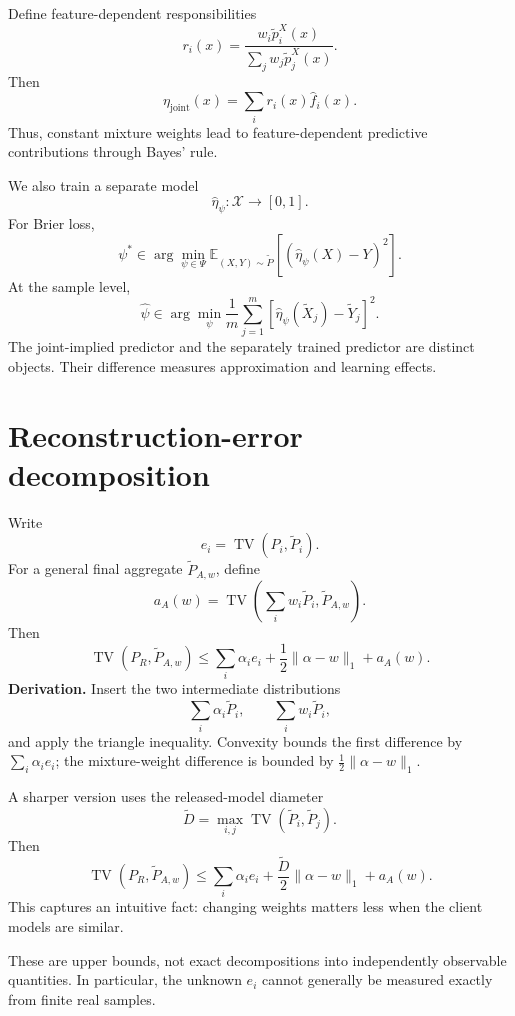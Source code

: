 \documentclass[11pt,a4paper]{article}
\begin{document}
Define feature-dependent responsibilities
\[
r_i(x)=\frac{w_i\widetilde p_i^X(x)}{\sum_jw_j\widetilde p_j^X(x)}.
\]
Then
\[
\eta_{\mathrm{joint}}(x)=\sum_i r_i(x)\widehat f_i(x).
\]
Thus, constant mixture weights lead to feature-dependent predictive contributions through Bayes' rule.

We also train a separate model
\[
\boxed{\widehat\eta_\psi:\mathcal X\rightarrow[0,1].}
\]
For Brier loss,
\[
\psi^*\in\arg\min_{\psi\in\Psi}
\mathbb E_{(X,Y)\sim\widetilde P}
\left[(\widehat\eta_\psi(X)-Y)^2\right].
\]
At the sample level,
\[
\widehat\psi\in\arg\min_\psi\frac1m\sum_{j=1}^{m}
\left[\widehat\eta_\psi(\widetilde X_j)-\widetilde Y_j\right]^2.
\]
The joint-implied predictor and the separately trained predictor are distinct objects. Their difference measures approximation and learning effects.

\section{Reconstruction-error decomposition}
Write
\[
e_i=\operatorname{TV}(P_i,\widetilde P_i).
\]
For a general final aggregate $\widetilde P_{A,w}$, define
\[
a_A(w)=\operatorname{TV}\left(\sum_iw_i\widetilde P_i,\widetilde P_{A,w}\right).
\]
Then
\[
\boxed{\operatorname{TV}(P_R,\widetilde P_{A,w})
\leq\sum_i\alpha_i e_i+\frac12\|\alpha-w\|_1+a_A(w).}
\]
\textbf{Derivation.} Insert the two intermediate distributions
\[
\sum_i\alpha_i\widetilde P_i,\qquad\sum_iw_i\widetilde P_i,
\]
and apply the triangle inequality. Convexity bounds the first difference by $\sum_i\alpha_i e_i$; the mixture-weight difference is bounded by $\frac12\|\alpha-w\|_1$.

A sharper version uses the released-model diameter
\[
\widetilde D=\max_{i,j}\operatorname{TV}(\widetilde P_i,\widetilde P_j).
\]
Then
\[
\boxed{\operatorname{TV}(P_R,\widetilde P_{A,w})
\leq\sum_i\alpha_i e_i+\frac{\widetilde D}{2}\|\alpha-w\|_1+a_A(w).}
\]
This captures an intuitive fact: changing weights matters less when the client models are similar.

These are upper bounds, not exact decompositions into independently observable quantities. In particular, the unknown $e_i$ cannot generally be measured exactly from finite real samples.
\end{document}

